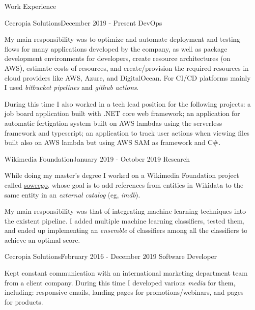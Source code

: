 \documentclass{resume} %
\begin{document}

\begin{rSection}{Work Experience}


\begin{rSubsection}{Cecropia Solutions}{December 2019 - Present}
{DevOps}{}
\item[] My main responsibility was to optimize and automate deployment and testing flows for many applications developed by the company, as well as package development environments for developers, create resource architectures (on AWS), estimate costs of resources, and create/provision the required resources in cloud providers like AWS, Azure, and DigitalOcean. For CI/CD platforms mainly I used \textit{bitbucket pipelines} and \textit{github actions}. 

During this time I also worked in a tech lead position for the following projects: a job board application built with .NET core web framework; an application for automatic fertigation system built on AWS lambdas using the serverless framework and typescript; an application to track user actions when viewing files built also on AWS lambda but using AWS SAM as framework and C\#. 
\end{rSubsection}

\begin{rSubsection}{Wikimedia Foundation}{January 2019 - October 2019}
{Research}{}
\item[] While doing my master's degree I worked on a Wikimedia Foundation project called \href{https://meta.wikimedia.org/wiki/Grants:Project/Hjfocs/soweego}{soweego}, whose goal is to add references from entities in Wikidata to the same entity in an \textit{external catalog} (eg, \textit{imdb}).

My main responsibility was that of integrating machine learning techniques into the existent pipeline. I added multiple machine learning classifiers, tested them, and ended up implementing an \textit{ensemble} of classifiers among all the classifiers to achieve an optimal score.
\end{rSubsection}

\begin{rSubsection}{Cecropia Solutions}{February 2016 - December 2019}
{Software Developer}{}
\item[] Kept constant communication with an international marketing department team from a client company. During this time I developed various \textit{media} for them, including: responsive emails, landing pages for promotions/webinars, and pages for products. 


\end{rSubsection}
\end{rSection}
\end{document}
